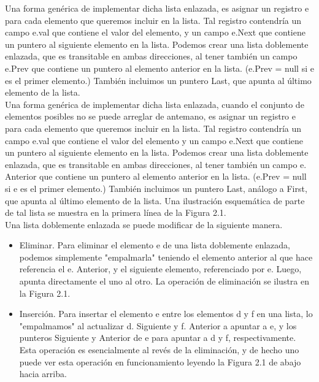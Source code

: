 \documentclass[a4paper, 12pt]{book}
\begin{document}
Una forma genérica de implementar dicha lista enlazada, es asignar un registro e para cada elemento que queremos incluir en la lista. Tal registro contendría un campo e.val que contiene el valor del elemento, y un campo e.Next que contiene un puntero al siguiente elemento en la lista. Podemos crear una lista doblemente enlazada, que es transitable en ambas direcciones, al tener también un campo e.Prev que contiene un puntero al elemento anterior en la lista. (e.Prev = null si e es el primer elemento.) También incluimos un puntero Last, que apunta al último elemento de la lista.\\ 

Una forma genérica de implementar dicha lista enlazada, cuando el conjunto de elementos posibles no se puede arreglar de antemano, es asignar un registro e para cada elemento que queremos incluir en la lista. Tal registro contendría un campo e.val que contiene el valor del elemento y un campo e.Next que contiene un puntero al siguiente elemento en la lista. Podemos crear una lista doblemente enlazada, que es transitable en ambas direcciones, al tener también un campo e. Anterior que contiene un puntero al elemento anterior en la lista. (e.Prev = null si e es el primer elemento.) También incluimos un puntero Last, análogo a First, que apunta al último elemento de la lista. Una ilustración esquemática de parte de tal lista se muestra en la primera línea de la Figura 2.1.\\

Una lista doblemente enlazada se puede modificar de la siguiente manera.

\begin{itemize}
 \item Eliminar. Para eliminar el elemento e de una lista doblemente enlazada, podemos simplemente "empalmarla" teniendo el elemento anterior al que hace referencia el e. Anterior, y el siguiente elemento, referenciado por e. Luego, apunta directamente el uno al otro. La operación de eliminación se ilustra en la Figura 2.1.
  \item Inserción. Para insertar el elemento e entre los elementos d y f en una lista, lo "empalmamos" al actualizar d. Siguiente y f. Anterior a apuntar a e, y los punteros Siguiente y Anterior de e para apuntar a d y f, respectivamente. Esta operación es esencialmente al revés de la eliminación, y de hecho uno puede ver esta operación en funcionamiento leyendo la Figura 2.1 de abajo hacia arriba. 
\end{itemize}
\end{document}
